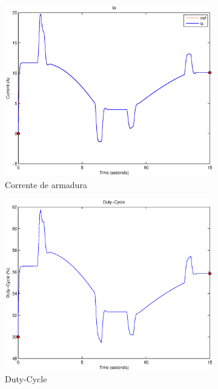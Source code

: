 \documentclass{article}
\begin{document}
\begin{figure}[H]
\begin{subfigure}{0.3\textwidth}
		\includegraphics[width=\linewidth]{matlab/ia5}
		\caption{Corrente de armadura}
	\end{subfigure}
	\begin{subfigure}{0.3\textwidth}
		\includegraphics[width=\linewidth]{matlab/d5}
		\caption{Duty-Cycle}
	\end{subfigure}
	\begin{subfigure}{0.3\textwidth}

\end{subfigure}
\end{figure}
\end{document}

